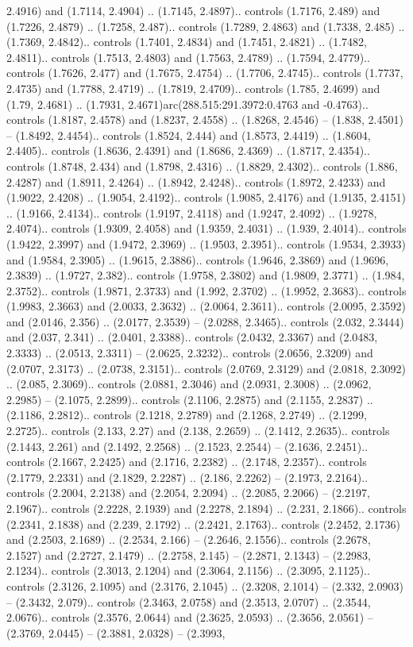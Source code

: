 2.4916) and (1.7114, 2.4904) .. (1.7145, 2.4897).. controls (1.7176, 2.489) and (1.7226, 2.4879) .. (1.7258, 2.487).. controls (1.7289, 2.4863) and (1.7338, 2.485) .. (1.7369, 2.4842).. controls (1.7401, 2.4834) and (1.7451, 2.4821) .. (1.7482, 2.4811).. controls (1.7513, 2.4803) and (1.7563, 2.4789) .. (1.7594, 2.4779).. controls (1.7626, 2.477) and (1.7675, 2.4754) .. (1.7706, 2.4745).. controls (1.7737, 2.4735) and (1.7788, 2.4719) .. (1.7819, 2.4709).. controls (1.785, 2.4699) and (1.79, 2.4681) .. (1.7931, 2.4671)arc(288.515:291.3972:0.4763 and -0.4763).. controls (1.8187, 2.4578) and (1.8237, 2.4558) .. (1.8268, 2.4546) -- (1.838, 2.4501) -- (1.8492, 2.4454).. controls (1.8524, 2.444) and (1.8573, 2.4419) .. (1.8604, 2.4405).. controls (1.8636, 2.4391) and (1.8686, 2.4369) .. (1.8717, 2.4354).. controls (1.8748, 2.434) and (1.8798, 2.4316) .. (1.8829, 2.4302).. controls (1.886, 2.4287) and (1.8911, 2.4264) .. (1.8942, 2.4248).. controls (1.8972, 2.4233) and (1.9022, 2.4208) .. (1.9054, 2.4192).. controls (1.9085, 2.4176) and (1.9135, 2.4151) .. (1.9166, 2.4134).. controls (1.9197, 2.4118) and (1.9247, 2.4092) .. (1.9278, 2.4074).. controls (1.9309, 2.4058) and (1.9359, 2.4031) .. (1.939, 2.4014).. controls (1.9422, 2.3997) and (1.9472, 2.3969) .. (1.9503, 2.3951).. controls (1.9534, 2.3933) and (1.9584, 2.3905) .. (1.9615, 2.3886).. controls (1.9646, 2.3869) and (1.9696, 2.3839) .. (1.9727, 2.382).. controls (1.9758, 2.3802) and (1.9809, 2.3771) .. (1.984, 2.3752).. controls (1.9871, 2.3733) and (1.992, 2.3702) .. (1.9952, 2.3683).. controls (1.9983, 2.3663) and (2.0033, 2.3632) .. (2.0064, 2.3611).. controls (2.0095, 2.3592) and (2.0146, 2.356) .. (2.0177, 2.3539) -- (2.0288, 2.3465).. controls (2.032, 2.3444) and (2.037, 2.341) .. (2.0401, 2.3388).. controls (2.0432, 2.3367) and (2.0483, 2.3333) .. (2.0513, 2.3311) -- (2.0625, 2.3232).. controls (2.0656, 2.3209) and (2.0707, 2.3173) .. (2.0738, 2.3151).. controls (2.0769, 2.3129) and (2.0818, 2.3092) .. (2.085, 2.3069).. controls (2.0881, 2.3046) and (2.0931, 2.3008) .. (2.0962, 2.2985) -- (2.1075, 2.2899).. controls (2.1106, 2.2875) and (2.1155, 2.2837) .. (2.1186, 2.2812).. controls (2.1218, 2.2789) and (2.1268, 2.2749) .. (2.1299, 2.2725).. controls (2.133, 2.27) and (2.138, 2.2659) .. (2.1412, 2.2635).. controls (2.1443, 2.261) and (2.1492, 2.2568) .. (2.1523, 2.2544) -- (2.1636, 2.2451).. controls (2.1667, 2.2425) and (2.1716, 2.2382) .. (2.1748, 2.2357).. controls (2.1779, 2.2331) and (2.1829, 2.2287) .. (2.186, 2.2262) -- (2.1973, 2.2164).. controls (2.2004, 2.2138) and (2.2054, 2.2094) .. (2.2085, 2.2066) -- (2.2197, 2.1967).. controls (2.2228, 2.1939) and (2.2278, 2.1894) .. (2.231, 2.1866).. controls (2.2341, 2.1838) and (2.239, 2.1792) .. (2.2421, 2.1763).. controls (2.2452, 2.1736) and (2.2503, 2.1689) .. (2.2534, 2.166) -- (2.2646, 2.1556).. controls (2.2678, 2.1527) and (2.2727, 2.1479) .. (2.2758, 2.145) -- (2.2871, 2.1343) -- (2.2983, 2.1234).. controls (2.3013, 2.1204) and (2.3064, 2.1156) .. (2.3095, 2.1125).. controls (2.3126, 2.1095) and (2.3176, 2.1045) .. (2.3208, 2.1014) -- (2.332, 2.0903) -- (2.3432, 2.079).. controls (2.3463, 2.0758) and (2.3513, 2.0707) .. (2.3544, 2.0676).. controls (2.3576, 2.0644) and (2.3625, 2.0593) .. (2.3656, 2.0561) -- (2.3769, 2.0445) -- (2.3881, 2.0328) -- (2.3993, 